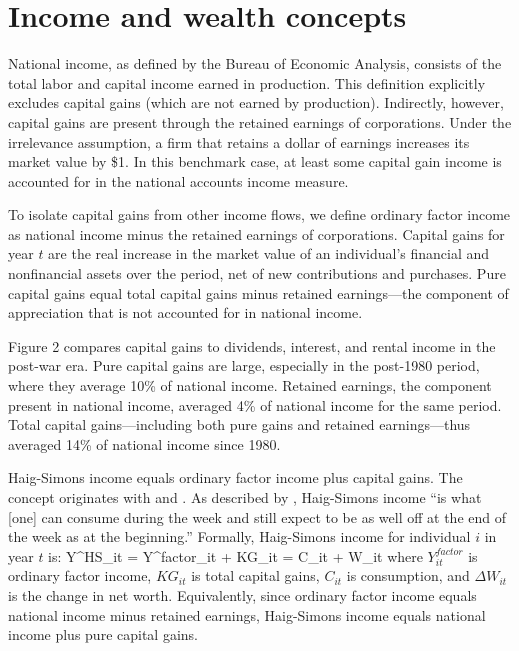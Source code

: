 \section{Income and wealth concepts}

National income, as defined by the Bureau of Economic Analysis, consists of the total labor and capital income earned in production. This definition explicitly excludes capital gains (which are not earned by production). Indirectly, however, capital gains are present through the retained earnings of corporations. Under the \citet{miller1961dividend} irrelevance assumption, a firm that retains a dollar of earnings increases its market value by \$1. In this benchmark case, at least some capital gain income is accounted for in the national accounts income measure.

To isolate capital gains from other income flows, we define ordinary factor income as national income minus the retained earnings of corporations. Capital gains for year $t$ are the real increase in the market value of an individual's financial and nonfinancial assets over the period, net of new contributions and purchases. Pure capital gains equal total capital gains minus retained earnings---the component of appreciation that is not accounted for in national income.

Figure 2 compares capital gains to dividends, interest, and rental income in the post-war era. Pure capital gains are large, especially in the post-1980 period, where they average 10\% of national income. Retained earnings, the component present in national income, averaged 4\% of national income for the same period. Total capital gains---including both pure gains and retained earnings---thus averaged 14\% of national income since 1980.

Haig-Simons income equals ordinary factor income plus capital gains. The concept originates with \citet{haig1921concept} and \citet{simons1938personal}. As described by \citet{hicks1939value}, Haig-Simons income ``is what [one] can consume during the week and still expect to be as well off at the end of the week as at the beginning.'' Formally, Haig-Simons income for individual $i$ in year $t$ is:
\be
Y^{HS}_{it} = Y^{factor}_{it} + KG_{it} = C_{it} + \Delta W_{it}
\ee
where $Y^{factor}_{it}$ is ordinary factor income, $KG_{it}$ is total capital gains, $C_{it}$ is consumption, and $\Delta W_{it}$ is the change in net worth. Equivalently, since ordinary factor income equals national income minus retained earnings, Haig-Simons income equals national income plus pure capital gains.

